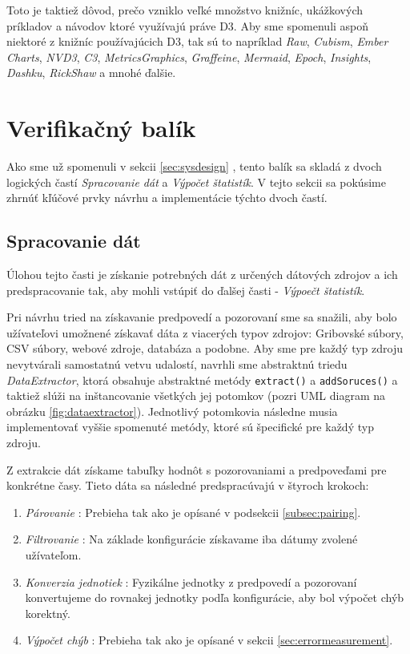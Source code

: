 Toto je taktiež dôvod, prečo vzniklo veľké množstvo knižníc, ukážkových príkladov a návodov ktoré využívajú práve D3. Aby sme spomenuli aspoň niektoré z knižníc používajúcich D3, tak sú to napríklad \textit{Raw}, \textit{Cubism}, \textit{Ember Charts}, \textit{NVD3}, \textit{C3}, \textit{MetricsGraphics}, \textit{Graffeine}, \textit{Mermaid}, \textit{Epoch}, \textit{Insights}, \textit{Dashku}, \textit{RickShaw} a mnohé ďalšie. 

\section{Verifikačný balík}
Ako sme už spomenuli v sekcii \ref{sec:sysdesign} , tento balík sa skladá z dvoch logických častí \textit{Spracovanie dát} a \textit{Výpočet štatistík}. V tejto sekcii sa pokúsime zhrnúť kľúčové prvky návrhu a implementácie týchto dvoch častí.
\subsection{Spracovanie dát}
Úlohou tejto časti je získanie potrebných dát z určených dátových zdrojov a ich predspracovanie tak, aby mohli vstúpiť do ďalšej časti - \textit{Výpoečt štatistík}.

Pri návrhu tried na získavanie predpovedí a pozorovaní sme sa snažili, aby bolo užívateľovi umožnené získavať dáta z viacerých typov zdrojov: Gribovské súbory, CSV súbory, webové zdroje, databáza a podobne. Aby sme pre každý typ zdroju nevytvárali samostatnú vetvu udalostí, navrhli sme abstraktnú triedu \textit{DataExtractor}, ktorá obsahuje abstraktné metódy \texttt{extract()} a \texttt{addSoruces()} a taktiež slúži na inštancovanie všetkých jej potomkov (pozri UML diagram na obrázku \ref{fig:dataextractor}). Jednotlivý potomkovia následne musia implementovať vyššie spomenuté metódy, ktoré sú špecifické pre každý typ zdroju.

Z extrakcie dát získame tabuľky hodnôt s pozorovaniami a predpoveďami pre konkrétne časy. Tieto dáta sa následné predspracúvajú v štyroch krokoch:

\begin{enumerate}
	\item \textit{Párovanie} : Prebieha tak ako je opísané v podsekcii \ref{subsec:pairing}.
	\item \textit{Filtrovanie} : Na základe konfigurácie získavame iba dátumy zvolené užívateľom.	\item \textit{Konverzia jednotiek} : Fyzikálne jednotky z predpovedí a pozorovaní konvertujeme do rovnakej jednotky podľa konfigurácie, aby bol výpočet chýb korektný.
	\item \textit{Výpočet chýb} : Prebieha tak ako je opísané v sekcii \ref{sec:errormeasurement}.
\end{enumerate}

